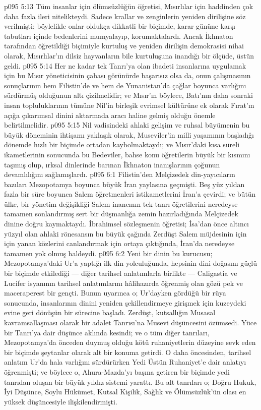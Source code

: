 \vs p095 5:13 Tüm insanlar için ölümsüzlüğün öğretisi, Mısırlılar için haddinden çok daha fazla ileri nitelikteydi. Sadece krallar ve zenginlerin yeniden dirilişine söz verilmişti; böylelikle onlar oldukça dikkatli bir biçimde, karar gününe karşı tabutları içinde bedenlerini mumyalayıp, korumaktalardı. Ancak İkhnaton tarafından öğretildiği biçimiyle kurtuluş ve yeniden dirilişin demokrasisi nihai olarak, Mısırlılar’ın dilsiz hayvanların bile kurtuluşuna inandığı bir ölçüde, üstün geldi.
\vs p095 5:14 Her ne kadar tek Tanrı’ya olan ibadeti insanlarına uygulamak için bu Mısır yöneticisinin çabası görünürde başarısız olsa da, onun çalışmasının sonuçlarının hem Filistin’de ve hem de Yunanistan’da çağlar boyunca varlığını sürdürmüş olduğunun altı çizilmelidir; ve Mısır’ın böylece, Batı’nın daha sonraki insan topluluklarının tümüne Nil’in birleşik evrimsel kültürüne ek olarak Fırat’ın açığa çıkarımsal dinini aktarmada aracı haline gelmiş olduğu önemle belirtilmelidir.
\vs p095 5:15 Nil vadisindeki ahlaki gelişim ve ruhsal büyümenin bu büyük döneminin ihtişamı yaklaşık olarak, Museviler’in milli yaşamının başladığı dönemde hızlı bir biçimde ortadan kaybolmaktaydı; ve Mısır’daki kısa süreli ikametlerinin sonucunda bu Bedeviler, bahse konu öğretilerin büyük bir kısmını taşımış olup, ırksal dinlerinde barınan İkhnaton inanışlarının çoğunun devamlılığını sağlamışlardı.
\vs p095 6:1 Filistin’den Melçizedek din\hyp{}yayıcıların bazıları Mezopotamya boyunca büyük İran yaylasına geçmişti. Beş yüz yıldan fazla bir süre boyunca Salem öğretmenleri istikametlerini İran’a çevirdi; ve bütün ülke, bir yönetim değişikliği Salem inancının tek\hyp{}tanrı öğretilerini neredeyse tamamen sonlandırmış sert bir düşmanlığa zemin hazırladığında Melçizedek dinine doğru kaymaktaydı. İbrahimsel sözleşmenin öğretisi; İsa’dan önce altıncı yüzyıl olan ahlaki rönesansın bu büyük çağında Zerdüşt Salem müjdesinin için için yanan közlerini canlandırmak için ortaya çıktığında, İran’da neredeyse tamamen yok olmuş haldeydi.
\vs p095 6:2 Yeni bir dinin bu kurucusu; Mezopotamya’daki Ur’a yaptığı ilk din yolculuğunda, hepsinin dini doğasını güçlü bir biçimde etkilediği --- diğer tarihsel anlatımlarla birlikte --- Caligastia ve Lucifer isyanının tarihsel anlatımlarını hâlihazırda öğrenmiş olan gözü pek ve maceraperest bir gençti. Bunun uyarınca o; Ur’dayken gördüğü bir rüya sonucunda, insanlarının dinini yeniden şekillendirmeye girişmek için kuzeydeki evine geri dönüşün bir sürecine başladı. Zerdüşt, kutsallığın Musasal kavramsallaşması olarak bir adalet Tanrısı’na Musevi düşüncesini özümsedi. Yüce bir Tanrı’ya dair düşünce aklında kesindi; ve o tüm diğer tanrıları, Mezopotamya’da önceden duymuş olduğu kötü ruhaniyetlerin düzeyine sevk eden bir biçimde şeytanlar olarak alt bir konuma getirdi. O daha öncesinden, tarihsel anlatım Ur’da hala varlığını sürdürürken Yedi Üstün Ruhaniyet’e dair anlatıyı öğrenmişti; ve böylece o, Ahura\hyp{}Mazda’yı başına getiren bir biçimde yedi tanrıdan oluşan bir büyük yıldız sistemi yarattı. Bu alt tanrıları o; Doğru Hukuk, İyi Düşünce, Soylu Hükümet, Kutsal Kişilik, Sağlık ve Ölümsüzlük’ün olası en yüksek düşüncesiyle ilişkilendirmişti.
